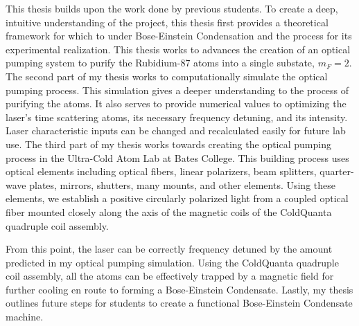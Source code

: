 This thesis builds upon the work done by previous students. To create a deep, intuitive understanding of the project, this thesis first provides a theoretical framework for which to under Bose-Einstein Condensation and the process for its experimental realization. This thesis works to advances the creation of an optical pumping system to purify the Rubidium-87 atoms into a single substate, $m_F = 2$. The second part of my thesis works to computationally simulate the optical pumping process. This simulation gives a deeper understanding to the process of purifying the atoms. It also serves to provide numerical values to optimizing the laser's time scattering atoms, its necessary frequency detuning, and its intensity. Laser characteristic inputs can be changed and recalculated easily for future lab use. The third part of my thesis works towards creating the optical pumping process in the Ultra-Cold Atom Lab at Bates College. This building process uses optical elements including optical fibers, linear polarizers, beam splitters, quarter-wave plates, mirrors, shutters, many mounts, and other elements. Using these elements, we establish a positive circularly polarized light from a coupled optical fiber mounted closely along the axis of the magnetic coils of the ColdQuanta quadruple coil assembly. 
 
 
 From this point, the laser can be correctly frequency detuned by the amount predicted in my optical pumping simulation. Using the ColdQuanta quadruple coil assembly, all the atoms can be effectively trapped by a magnetic field for further cooling en route to forming a Bose-Einstein Condensate. Lastly, my thesis outlines future steps for students to create a functional Bose-Einstein Condensate machine.


 